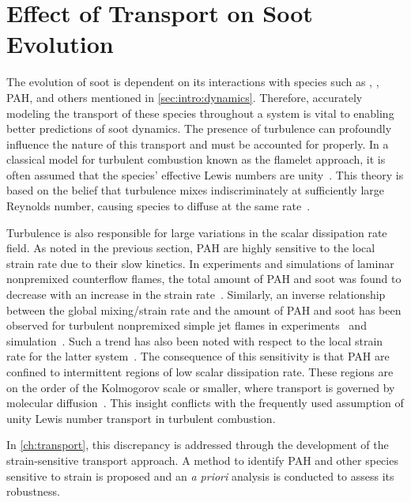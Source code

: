 \section{Effect of Transport on Soot Evolution}
\label{sec:intro:transport}

The evolution of soot is dependent on its interactions with species such as , , PAH, and others mentioned in \cref{sec:intro:dynamics}. Therefore, accurately modeling the transport of these species throughout a system is vital to enabling better predictions of soot dynamics. The presence of turbulence can profoundly influence the nature of this transport and must be accounted for properly. In a classical model for turbulent combustion known as the flamelet approach, it is often assumed that the species' effective Lewis numbers are unity~\cite{peters1984}. This theory is based on the belief that turbulence mixes indiscriminately at sufficiently large Reynolds number, causing species to diffuse at the same rate~\cite{pitsch19981057}.

Turbulence is also responsible for large variations in the scalar dissipation rate field. As noted in the previous section, PAH are highly sensitive to the local strain rate due to their slow kinetics. In experiments and simulations of laminar nonpremixed counterflow flames, the total amount of PAH and soot was found to decrease with an increase in the strain rate~\cite{decroix2000,cuoci2009,huijnen2010,wang2016433}. Similarly, an inverse relationship between the global mixing/strain rate and the amount of PAH and soot has been observed for turbulent nonpremixed simple jet flames in experiments~\cite{kent1984,qamar2005,narayanaswamy2013,mahmoud2017} and simulation~\cite{attili2015}. Such a trend has also been noted with respect to the local strain rate for the latter system~\cite{bisetti2012,mueller2013,attili2014}. The consequence of this sensitivity is that PAH are confined to intermittent regions of low scalar dissipation rate. These regions are on the order of the Kolmogorov scale or smaller, where transport is governed by molecular diffusion~\cite{vaishnavi2008}. This insight conflicts with the frequently used assumption of unity Lewis number transport in turbulent combustion.

In \cref{ch:transport}, this discrepancy is addressed through the development of the strain-sensitive transport approach. A method to identify PAH and other species sensitive to strain is proposed and an \textit{a priori} analysis is conducted to assess its robustness.


